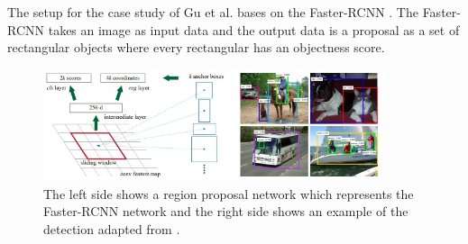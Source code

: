 The setup for the case study of Gu et al. bases on the Faster-RCNN \cite{DBLP:conf/nips/RenHGS15}. The Faster-RCNN takes an image as input data and the output data is a proposal as a set of rectangular objects where every rectangular has an objectness score.

\begin{figure}[ht!]
  \centering
  \includegraphics[width=10cm]{pictures/f_rcnn.jpg}
  \caption{The left side shows a region proposal network which represents the Faster-RCNN network and the right side shows an example of the detection adapted from \cite{DBLP:conf/nips/RenHGS15}.}
  \label{fig:f_rcnn}
\end{figure}

